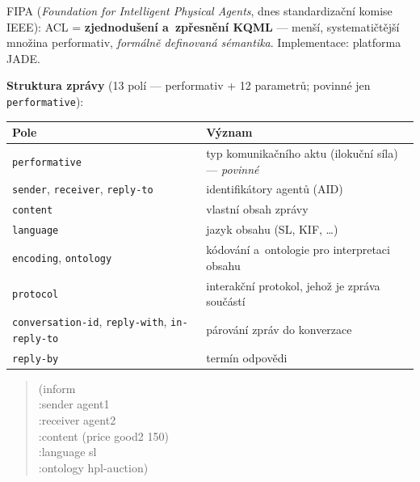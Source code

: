 \documentclass[11pt,a4paper]{article}
\theoremstyle{definition}
\begin{document}
\begin{defbox}
FIPA (\emph{Foundation for Intelligent Physical Agents}, dnes standardizační komise IEEE):
ACL = \textbf{zjednodušení a~zpřesnění KQML} --- menší, systematičtější množina performativ,
\emph{formálně definovaná sémantika}. Implementace: platforma JADE.

\textbf{Struktura zprávy} (13 polí --- performativ + 12 parametrů; povinné jen
\texttt{performative}):
\begin{center}\small
\begin{tabular}{ll}
\toprule
\textbf{Pole} & \textbf{Význam} \\
\midrule
\texttt{performative} & typ komunikačního aktu (ilokuční síla) --- \emph{povinné} \\
\texttt{sender}, \texttt{receiver}, \texttt{reply-to} & identifikátory agentů (AID) \\
\texttt{content} & vlastní obsah zprávy \\
\texttt{language} & jazyk obsahu (SL, KIF, \dots) \\
\texttt{encoding}, \texttt{ontology} & kódování a~ontologie pro interpretaci obsahu \\
\texttt{protocol} & interakční protokol, jehož je zpráva součástí \\
\texttt{conversation-id}, \texttt{reply-with}, \texttt{in-reply-to} & párování zpráv do konverzace \\
\texttt{reply-by} & termín odpovědi \\
\bottomrule
\end{tabular}
\end{center}
\begin{quote}\small\ttfamily
(inform\\
\hspace*{1em}:sender agent1\\
\hspace*{1em}:receiver agent2\\
\hspace*{1em}:content (price good2 150)\\
\hspace*{1em}:language sl\\
\hspace*{1em}:ontology hpl-auction)
\end{quote}
\end{defbox}
\end{document}

